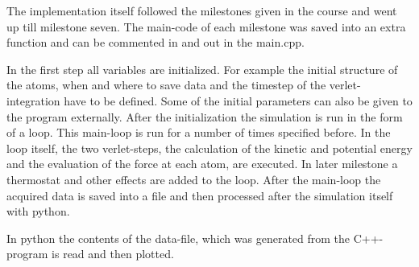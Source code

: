 The implementation itself followed the milestones given in the course and went up till milestone seven. 
The main-code of each milestone was saved into an extra function and can be commented in and out in the main.cpp.


\par 
In the first step all variables are initialized. For example the initial structure of the atoms, when and where to save data and the timestep of the verlet-integration have to be defined. Some of the initial parameters can also be given to the program externally. After the initialization the simulation is run in the form of a loop. This main-loop is run for a number of times specified before. In the loop itself, the two verlet-steps, the calculation of the kinetic and potential energy and the evaluation of the force at each atom, are executed. In later milestone a thermostat and other effects are added to the loop. 
After the main-loop the acquired data is saved into a file and then processed after the simulation itself with python. 

\par 
In python the contents of the data-file, which was generated from the C++-program is read and then plotted. 




